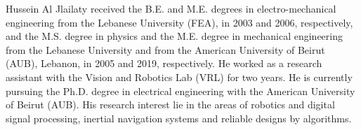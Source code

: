 \documentclass[journal]{IEEEtran}
\begin{document}
\ifCLASSOPTIONcaptionsoff
  \newpage
\fi





\pagebreak




%


% 

\begin{IEEEbiographynophoto}{Hussein Al Jlailaty}
received the B.E. and M.E. degrees in electro-mechanical engineering from the Lebanese University (FEA), in 2003 and 2006, respectively, and the M.S. degree in physics and the M.E. degree in mechanical engineering from the Lebanese University and from the American University of Beirut (AUB), Lebanon, in 2005 and 2019, respectively. He worked as a research assistant with the Vision and Robotics Lab (VRL) for two years.  He is currently pursuing
the Ph.D. degree in electrical engineering with
the American University of Beirut
(AUB).
His research interest lie in the areas of robotics and digital signal processing, inertial navigation systems and reliable designs by algorithms.
\end{IEEEbiographynophoto}
\end{document}
